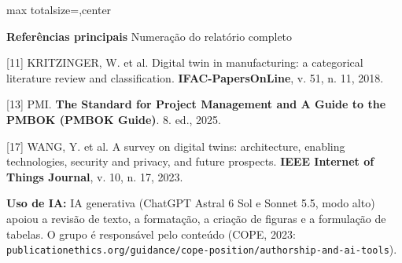 \documentclass[12pt]{article}
\begin{document}
\begin{adjustbox}{max totalsize={\textwidth}{\textheight},center}
{%
\begin{tcolorbox}[enhanced,colback=white,colframe=exLine,boxrule=0.45mm,arc=1.5mm,
  left=4mm,right=4mm,top=3mm,bottom=3mm]
{\fontsize{16}{20}\selectfont\bfseries\color{exLine} Referências principais}\hfill
{\fontsize{11}{14}\selectfont Numeração do relatório completo}\par\vspace{2mm}
{\fontsize{10.5}{13}\selectfont
\begin{minipage}[t]{0.31\linewidth}\vspace{0pt}
[11] KRITZINGER, W. et al. Digital twin in manufacturing: a categorical literature review and classification. \textbf{IFAC-PapersOnLine}, v. 51, n. 11, 2018.
\end{minipage}\hfill
\begin{minipage}[t]{0.31\linewidth}\vspace{0pt}
[13] PMI. \textbf{The Standard for Project Management and A Guide to the PMBOK (PMBOK Guide)}. 8. ed., 2025.
\end{minipage}\hfill
\begin{minipage}[t]{0.31\linewidth}\vspace{0pt}
[17] WANG, Y. et al. A survey on digital twins: architecture, enabling technologies, security and privacy, and future prospects. \textbf{IEEE Internet of Things Journal}, v. 10, n. 17, 2023.
\end{minipage}}
\end{tcolorbox}

\vspace{2mm}

\vspace{2mm}
{\fontsize{10.5}{13}\selectfont\color{ctxText}\textbf{Uso de IA:} IA generativa (ChatGPT Astral 6 Sol e Sonnet 5.5, modo alto) apoiou a revisão de texto, a formatação, a criação de figuras e a formulação de tabelas. O grupo é responsável pelo conteúdo (COPE, 2023: \texttt{publicationethics.org/guidance/cope-position/authorship-and-ai-tools}).\par}

}%
\end{adjustbox}
\end{document}
